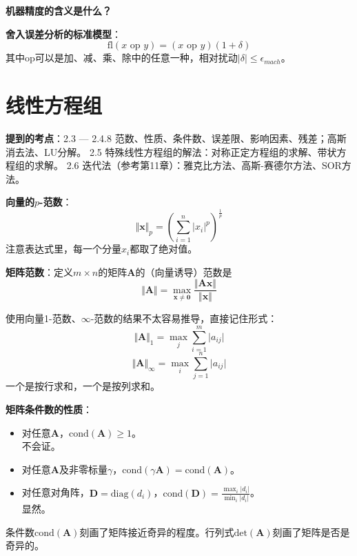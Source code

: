 \documentclass[14pt, letterpaper, UTF8, fontset=windowsnew, heading=true]{article}
\providecommand{\abs}[1]{\left\vert#1\right\vert}
\providecommand{\norm}[1]{\left\Vert#1\right\Vert}
\begin{document}
\par \textbf{机器精度的含义是什么？}

\par \textbf{舍入误差分析的标准模型}：
$$\text{fl}(x\text{ op }y)=(x\text{ op }y)(1+\delta)$$
其中op可以是加、减、乘、除中的任意一种，相对扰动$\vert\delta\vert\leq\epsilon_{mach}$。

\part{线性方程组}

\textbf{提到的考点}：2.3 --- 2.4.8 范数、性质、条件数、误差限、影响因素、残差；高斯消去法、LU分解。
2.5 特殊线性方程组的解法：对称正定方程组的求解、带状方程组的求解。
2.6 迭代法（参考第11章）：雅克比方法、高斯-赛德尔方法、SOR方法。

\par
\textbf{向量的$p$-范数}：
$$\Vert \bm{x}\Vert_p=\left(\sum_{i=1}^n\vert x_i\vert^p\right)^{\frac{1}{p}}$$
注意表达式里，每一个分量$x_i$都取了绝对值。

\par
\textbf{矩阵范数}：定义$m\times n$的矩阵$\bm{A}$的（向量诱导）范数是
$$\Vert \bm{A}\Vert=\max_{\bm{x}\neq \bm{0}}\frac{\Vert\bm{Ax}\Vert}{\Vert\bm{x}\Vert}$$

使用向量1-范数、$\infty$-范数的结果不太容易推导，直接记住形式：
$$\Vert\bm{A}\Vert_1=\max_j\sum_{i=1}^m\vert a_{ij}\vert$$
$$\Vert\bm{A}\Vert_\infty=\max_i\sum_{j=1}^n\vert a_{ij}\vert$$
一个是按行求和，一个是按列求和。

\par
\textbf{矩阵条件数的性质}：
\begin{itemize}
	\item
	对任意$\bm{A}$，$\text{cond}(\bm{A})\geq 1$。\\
	不会证。
	\item
	对任意$\bm{A}$及非零标量$\gamma$，$\text{cond}(\gamma\bm{A})=\text{cond}(\bm{A})$。 \\
	\item
	对任意对角阵，$\bm{D}=\text{diag}(d_i)$，$\text{cond}(\bm{D})=\frac{\max_i\abs{d_i}}{\min_i\abs{d_i}}$。 \\
	显然。
\end{itemize}
\par
条件数$\text{cond}(\bm{A})$刻画了矩阵接近奇异的程度。行列式$\text{det}(\bm{A})$刻画了矩阵是否是奇异的。
\end{document}
